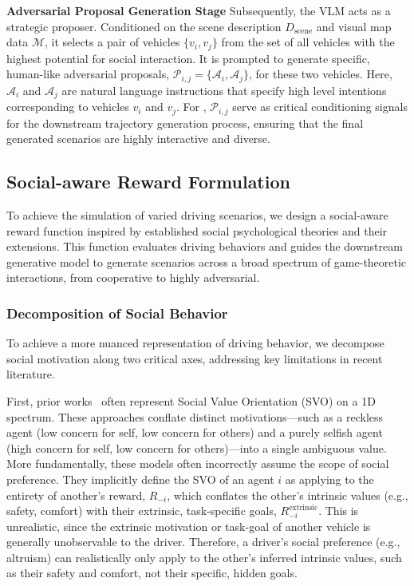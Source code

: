 \textbf{Adversarial Proposal Generation Stage} Subsequently, the VLM acts as a strategic proposer. Conditioned on the scene description $D_{\text{scene}}$ and visual map data $\mathcal{M}$, it selects a pair of vehicles $\{v_i,v_j\}$ from the set of all vehicles with the highest potential for social interaction. It is prompted to generate specific, human-like adversarial proposals, $\mathcal{P}_{i, j} = \{\mathcal{A}_i, \mathcal{A}_j\}$, for these two vehicles. Here, $\mathcal{A}_i$ and $\mathcal{A}_j$  are natural language instructions that specify high level intentions corresponding to vehicles $v_i$ and $v_j$. For \our,  $\mathcal{P}_{i, j}$ serve as critical conditioning signals for the downstream trajectory generation process, ensuring that the final generated scenarios are highly interactive and diverse.

\subsection{Social-aware Reward Formulation}

To achieve the simulation of varied driving scenarios, we design a social-aware reward function inspired by established social psychological theories and their extensions. This function evaluates driving behaviors and guides the downstream generative model to generate scenarios across a broad spectrum of game-theoretic interactions, from cooperative to highly adversarial.

\subsubsection{Decomposition of Social Behavior} 

To achieve a more nuanced representation of driving behavior, we decompose social motivation along two critical axes, addressing key limitations in recent literature. 

First, prior works~\citep{schwarting2019social, dai2023socially} often represent Social Value Orientation (SVO) on a 1D spectrum. These approaches conflate distinct motivations—such as a reckless agent (low concern for self, low concern for others) and a purely selfish agent (high concern for self, low concern for others)—into a single ambiguous value. More fundamentally, these models often incorrectly assume the scope of social preference. They implicitly define the SVO of an agent $i$ as applying to the entirety of another's reward, $R_{-i}$, which conflates the other's intrinsic values (e.g., safety, comfort) with their extrinsic, task-specific goals, $R_{-i}^{\text{extrinsic}}$. This is unrealistic, since the extrinsic motivation or task-goal of another vehicle is generally unobservable to the driver. Therefore, a driver's social preference (e.g., altruism) can realistically only apply to the other's inferred intrinsic values, such as their safety and comfort, not their specific, hidden goals.

